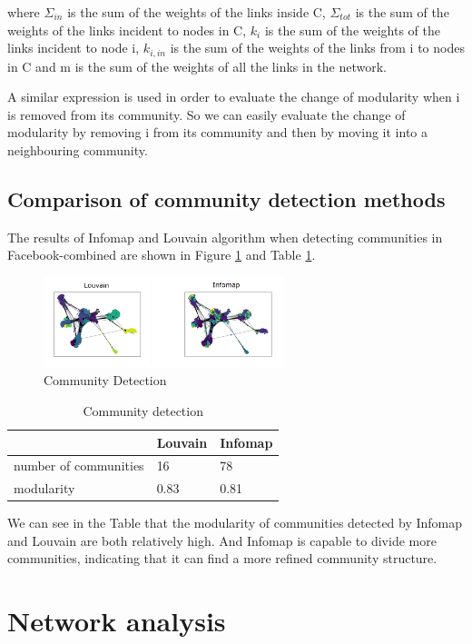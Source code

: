 \documentclass[fleqn,10pt]{SelfArx} %
\begin{document}
	where $\Sigma_{in}$ is the sum of the weights of the links inside C, $\Sigma_{tot}$ is the sum of the weights of the links incident to nodes in C, $k_i$ is the sum of the weights of the links incident to
	node i, $k_{i,in}$ is the sum of the weights of the links from i to nodes in C and m is the sum of the weights of all the links in the network.
	
	A similar expression is used in order to evaluate the change of modularity when i is removed from its community. So we can easily evaluate the change of modularity by removing i from its community and then by moving it into a neighbouring community.
	
	\subsection{Comparison of community detection methods}
	
	The results of Infomap and Louvain algorithm when detecting communities in Facebook-combined are shown in Figure
 	\ref{cdf} and Table \ref{cdoi}.
 	
	\begin{figure}
		\centering
		\includegraphics[width=7cm]{figure/facebook community detection.png}
		\caption{Community Detection}
		\label{cdf}
	\end{figure}
	
	\begin{table}[]
		\centering
		\begin{tabular}{lll}
			\hline
			& Louvain & Infomap \\ \hline
			number of communities & 16      & 78      \\
			modularity            & 0.83    & 0.81    \\ \hline
		\end{tabular}
		\caption{Community detection}
		\label{cdoi}
	\end{table}
	
	We can see in the Table that the modularity of communities detected by Infomap and Louvain are both relatively high. And Infomap is capable to divide more communities, indicating that it can find a more refined community structure.
	
	\section{Network analysis}
\end{document}
